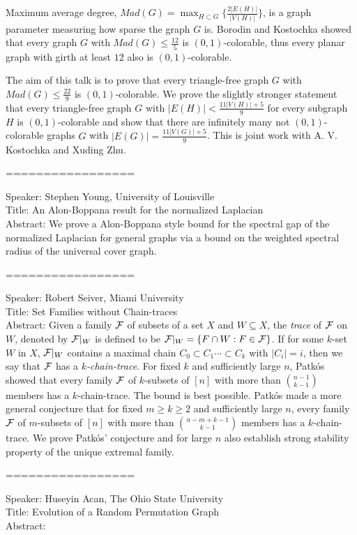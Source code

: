 \documentclass[11pt]{article}
\def\cF{{\cal F}}
\begin{document}
Maximum average degree, $Mad(G)= \max_{H\subset G}\{\frac{2|E(H)|}{|V(H)|}\}$, is a graph parameter measuring how sparse the  graph $G$ is. Borodin and Kostochka showed that every graph $G$ with $Mad(G)\leq \frac{12}{5}$ is $(0,1)$-colorable, thus every planar graph with girth at least $12$ also is $(0,1)$-colorable.

The aim of this talk is to prove that every triangle-free graph $G$ with $Mad(G)\leq \frac{22}{9}$ is $(0,1)$-colorable. We prove the slightly
stronger statement that every triangle-free graph $G$ with $|E(H)|<\frac{11|V(H)|+5}{9}$ for every subgraph $H$ is $(0,1)$-colorable and show that there are infinitely many not  $(0,1)$-colorable graphs $G$ with $|E(G)|=\frac{11|V(G)|+5}{9}$. This is joint work with A. V. Kostochka and Xuding Zhu.


=================



Speaker: Stephen Young, University of Louisville\\
Title: An Alon-Boppana result for the normalized Laplacian\\
Abstract: We prove a Alon-Boppana style bound for the spectral gap of the normalized
Laplacian for general graphs via a bound on the weighted spectral radius of
the universal cover graph.

=================


Speaker: Robert Seiver, Miami University\\
Title: Set Families without Chain-traces\\
Abstract: Given a family $\cF$ of subsets of a set $X$ and $W\subseteq X$, the {\it trace} of $\cF$ on $W$, denoted by $\cF|_W$ is defined to be  $\cF|_W=\{F\cap W: F\in \cF\}$. If for some $k$-set $W$ in $X$,
$\cF|_W$ contains a maximal chain $C_0\subset C_1\cdots \subset C_k$ with $|C_i|=i$,
then we say that $\cF$ has a {\it $k$-chain-trace}. For fixed $k$ and sufficiently large $n$, Patk\'os  showed that every family $\cF$ of $k$-subsets of $[n]$ with more than $\binom{n-1}{k-1}$ members
has a $k$-chain-trace. The bound is best possible. Patk\'os made a more general conjecture
that for fixed $m\geq k\geq 2$ and sufficiently large $n$, every family $\cF$ of $m$-subsets of $[n]$ with
more than $\binom{n-m+k-1}{k-1}$ members has a $k$-chain-trace. We prove Patk\'os' conjecture and for large $n$ also establish strong stability property of the unique
extremal family.

=================


Speaker: Huseyin Acan, The Ohio State University\\
Title: Evolution of a Random Permutation Graph\\
Abstract:
\end{document}
